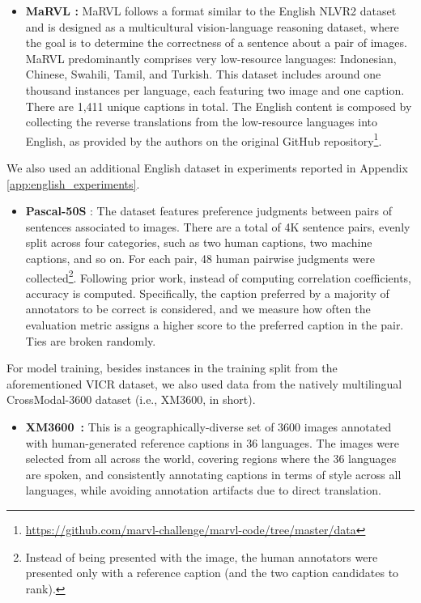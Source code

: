 \begin{itemize}
\item \textbf{MaRVL \cite{liu2021visually}: } MaRVL follows a format similar to the English NLVR2 dataset~\cite{suhr2019corpus} and is designed as a multicultural vision-language reasoning dataset, where the goal is to determine the correctness of a sentence about a pair of images. MaRVL predominantly comprises very low-resource languages: Indonesian, Chinese, Swahili, Tamil, and Turkish. This dataset includes around one thousand instances per language, each featuring two image and one caption. There are 1,411 unique captions in total. The English content is composed by collecting the reverse translations from the low-resource languages into English, as provided by the authors on the original GitHub repository\footnote{\url{https://github.com/marvl-challenge/marvl-code/tree/master/data}}. 
\end{itemize}

We also used an additional English dataset in experiments reported in Appendix \ref{app:english_experiments}.
\begin{itemize}
    \item {\textbf{Pascal-50S} \cite{vedantam2015cider}}: The dataset features preference judgments between pairs of sentences associated to images. There are a total of 4K sentence pairs, evenly split across four categories, such as two human captions, two machine captions, and so on. For each pair, 48 human pairwise judgments were collected\footnote{Instead of being presented with the image, the human annotators were presented only with a reference caption (and the two caption candidates to rank).}. Following prior work, instead of computing correlation coefficients, accuracy is computed. Specifically, the caption preferred by a majority of annotators to be correct is considered, and we measure how often the evaluation metric assigns a higher score to the preferred caption in the pair. Ties are broken randomly.
\end{itemize}

For model training, besides instances in the training split from the aforementioned VICR dataset, we also used data from the natively multilingual CrossModal-3600 dataset (i.e., XM3600, in short). 

\begin{itemize}
\item \textbf{XM3600~\cite{thapliyal2022crossmodal}:} This is a geographically-diverse set of 3600 images annotated with human-generated reference captions in 36 languages. The images were selected from all across the world, covering regions where the 36 languages are spoken, and consistently annotating captions in terms of style across all languages, while avoiding annotation artifacts due to direct translation.
\end{itemize}

